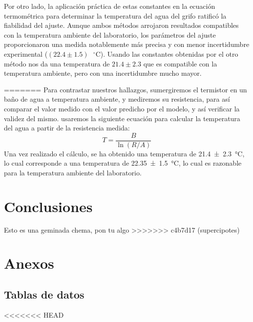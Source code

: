 \documentclass[11pt,a4paper]{article}
\begin{document}
\begin{itemize}
Por otro lado, la aplicación práctica de estas constantes en la ecuación termométrica para determinar la temperatura del agua del grifo ratificó la fiabilidad del ajuste. Aunque ambos métodos arrojaron resultados compatibles con la temperatura ambiente del laboratorio, los parámetros del ajuste proporcionaron una medida notablemente más precisa y con menor incertidumbre experimental ($(22.4\pm1.5)\text{ }^{\circ}\text{C}$). Usando las constantes obtenidas por el otro método nos da una temperatura de $21.4\pm2.3$ que es compatible con la temperatura ambiente, pero con una incertidumbre mucho mayor.


=======
Para contrastar nuestros hallazgos, sumergiremos el termistor en un baño de agua a temperatura ambiente, y mediremos su resistencia, para así comparar el valor medido con el valor predicho por el modelo, y así verificar la validez del mismo.
usaremos la siguiente ecuación para calcular la temperatura del agua a partir de la resistencia medida:
\begin{equation}
    T = \frac{B}{\ln(R/A)}
\end{equation}
Una vez realizado el cálculo, se ha obtenido una temperatura de \qty{21.4 \pm 2.3}{\degreeCelsius}, lo cual corresponde a una temperatura de \qty{22.35 \pm 1.5}{\degreeCelsius}, lo cual es razonable para la temperatura ambiente del laboratorio.

\section{Conclusiones}
Esto es una geminada chema, pon tu algo
>>>>>>> c4b7d17 (supercipotes)
\appendix
\section{Anexos}

\subsection{Tablas de datos}
<<<<<<< HEAD


\end{itemize}
\end{document}
